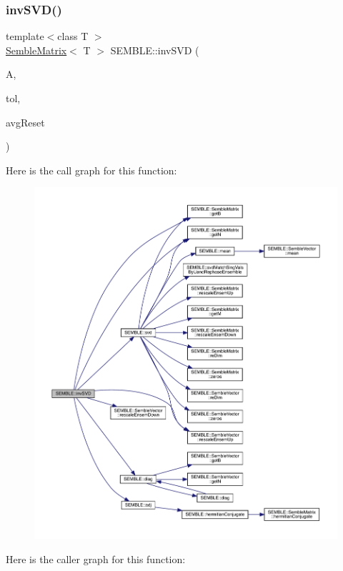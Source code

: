 \subsubsection{\texorpdfstring{invSVD()}{invSVD()}}
{\footnotesize\ttfamily template$<$class T $>$ \\
\mbox{\hyperlink{structSEMBLE_1_1SembleMatrix}{Semble\+Matrix}}$<$ T $>$ S\+E\+M\+B\+L\+E\+::inv\+S\+VD (\begin{DoxyParamCaption}\item[{const \mbox{\hyperlink{structSEMBLE_1_1SembleMatrix}{Semble\+Matrix}}$<$ T $>$ \&}]{A,  }\item[{const double}]{tol,  }\item[{double \&}]{avg\+Reset }\end{DoxyParamCaption})}

Here is the call graph for this function\+:
\nopagebreak
\begin{figure}[H]
\begin{center}
\leavevmode
\includegraphics[width=350pt]{d7/dfd/namespaceSEMBLE_adf8aee09f619bd4b2d88858a50ed5eee_cgraph}
\end{center}
\end{figure}
Here is the caller graph for this function\+:
\nopagebreak
